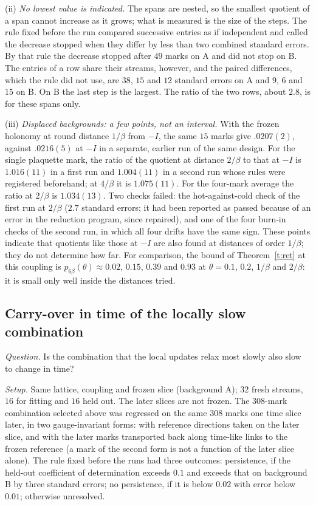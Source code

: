 (ii) \emph{No lowest value is indicated.} The spans are nested, so the smallest quotient of a span cannot
increase as it grows; what is measured is the size of the steps. The rule fixed before the run compared
successive entries as if independent and called the decrease stopped when they differ by less than two
combined standard errors. By that rule the decrease stopped after $49$ marks on A and did not stop on B. The
entries of a row share their streams, however, and the paired differences, which the rule did not use, are
$38$, $15$ and $12$ standard errors on A and $9$, $6$ and $15$ on B. On B the last step is the largest. The
ratio of the two rows, about $2.8$, is for these spans only.

(iii) \emph{Displaced backgrounds: a few points, not an interval.} With the frozen holonomy at round distance
$1/\beta$ from $-I$, the same $15$ marks give $.0207(2)$, against $.0216(5)$ at $-I$ in a separate, earlier
run of the same design. For the single plaquette mark, the ratio of the quotient at distance $2/\beta$ to that
at $-I$ is $1.016(11)$ in a first run and $1.004(11)$ in a second run whose rules were registered beforehand;
at $4/\beta$ it is $1.075(11)$. For the four-mark average the ratio at $2/\beta$ is $1.034(13)$. Two checks
failed: the hot-against-cold check of the first run at $2/\beta$ ($2.7$ standard errors; it had been reported
as passed because of an error in the reduction program, since repaired), and one of the four burn-in checks
of the second run, in which all four drifts have the same sign. These points indicate that quotients like
those at $-I$ are also found at distances of order $1/\beta$; they do not determine how far. For
comparison, the bound of Theorem~\ref{t:ret} at this coupling is $p_{6\beta}(\theta)\approx0.02$, $0.15$,
$0.39$ and $0.93$ at $\theta=0.1$, $0.2$, $1/\beta$ and $2/\beta$: it is small only well inside the distances
tried.

\subsection{Carry-over in time of the locally slow combination}\label{s:time}
\emph{Question.} Is the combination that the local updates relax most slowly also slow to change in time?

\emph{Setup.} Same lattice, coupling and frozen slice (background A); $32$ fresh streams, $16$ for fitting
and $16$ held out. The later slices are not frozen. The $308$-mark combination selected above was regressed on
the same $308$ marks one time slice later, in two gauge-invariant forms: with reference directions taken on
the later slice, and with the later marks transported back along time-like links to the frozen reference (a
mark of the second form is not a function of the later slice alone). The rule fixed before the runs had three
outcomes: persistence, if the held-out coefficient of determination exceeds $0.1$ and exceeds that on
background B by three standard errors; no persistence, if it is below $0.02$ with error below $0.01$;
otherwise unresolved.

